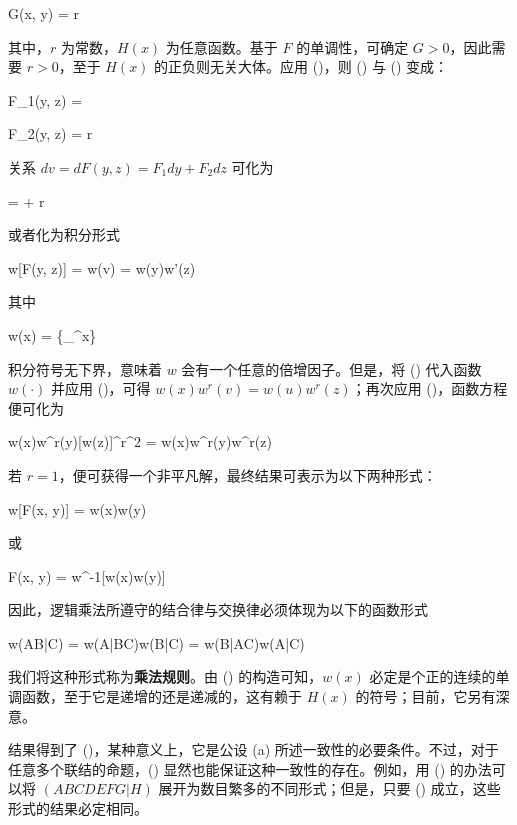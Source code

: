 \startformula
G(x, y) = r
\stopformula

其中，$r$ 为常数，$H(x)$ 为任意函数。基于 $F$ 的单调性，可确定 $G > 0$，因此需要 $r > 0$，至于 $H(x)$ 的正负则无关大体。应用 ()，则 (\in[eq-U]) 与 (\in[eq-V]) 变成：

\placeformula
\startformula
F_1(y, z) =  
\stopformula

\placeformula
\startformula
F_2(y, z) = r 
\stopformula

关系 $dv=dF(y, z)=F_1dy + F_2dz$ 可化为

\placeformula
\startformula
{} =  + r
\stopformula

或者化为积分形式

\placeformula[eq-int]
\startformula
w[F(y, z)] = w(v) = w(y)w'(z)
\stopformula

其中

\placeformula[w-func]
\startformula
w(x) = \left\{\int_{}^{x}\right\}
\stopformula

积分符号无下界，意味着 $w$ 会有一个任意的倍增因子。但是，将 (\in[eq-target]) 代入函数 $w(\cdot)$ 并应用 (\in[eq-int])，可得 $w(x)w^r(v) = w(u)w^r(z)$；再次应用 (\in[eq-int])，函数方程便可化为

\placeformula
\startformula
w(x)w^r(y)[w(z)]^{r^2} = w(x)w^r(y)w^r(z)
\stopformula

若 $r = 1$，便可获得一个非平凡解，最终结果可表示为以下两种形式：

\placeformula
\startformula
w[F(x, y)] = w(x)w(y)
\stopformula

或

\startformula
F(x, y) = w^{-1}[w(x)w(y)]
\stopformula

因此，逻辑乘法所遵守的结合律与交换律必须体现为以下的函数形式

\startformula
w(AB|C) = w(A|BC)w(B|C) = w(B|AC)w(A|C)
\stopformula

我们将这种形式称为{\bf 乘法规则}。由 (\in[w-func]) 的构造可知，$w(x)$ 必定是个正的连续的单调函数，至于它是递增的还是递减的，这有赖于 $H(x)$ 的符号；目前，它另有深意。

结果得到了 ()，某种意义上，它是公设 (a) 所述一致性的必要条件。不过，对于任意多个联结的命题，() 显然也能保证这种一致性的存在。例如，用 () 的办法可以将 $(ABCDEFG|H)$ 展开为数目繁多的不同形式；但是，只要 () 成立，这些形式的结果必定相同。

